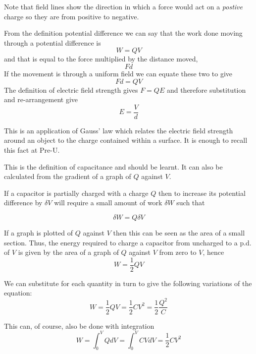 \documentclass[main.tex]{subfiles}
\begin{document}
Note that field lines show the direction in which a force would act on a \emph{postive} charge so they are from positive to negative.


From the definition potential difference we can say that the work done moving through a potential difference is \[ W = QV \] and that is equal to the force multiplied by the distance moved, \[ Fd \] If the movement is through a uniform field we can equate these two to give
\[ Fd = QV \]
The definition of electric field strength gives $F=QE$ and therefore substitution and re-arrangement give \[ E = \frac{V}{d} \]


This is an application of Gauss' law which relates the electric field strength around an object to the charge contained within a surface. It is enough to recall this fact at Pre-U.


This is the definition of capacitance and should be learnt. It can also be calculated from the gradient of a graph of $Q$ against $V$.


If a capacitor is partially charged with a charge $Q$ then to increase its potential difference by $\delta V$ will require a small amount of work $\delta W$ such that

\[ \delta W = Q \delta V  \]

If a graph is plotted of $Q$ against $V$ then this can be seen as the area of a small section. Thus, the energy required to charge a capacitor from uncharged to a p.d. of $V$ is given by the area of a graph of $Q$ against $V$ from zero to $V$, hence
\[ W = \frac{1}{2}QV \]

We can substitute for each quantity in turn to give the following variations of the equation:
\[ W = \frac{1}{2}QV = \frac{1}{2}CV^2 = \frac{1}{2}\frac{Q^2}{C} \]

This can, of course, also be done with integration
\[ W = \int_0^V Q dV = \int_0^V CV dV  = \frac{1}{2}CV^2 \]
\end{document}
